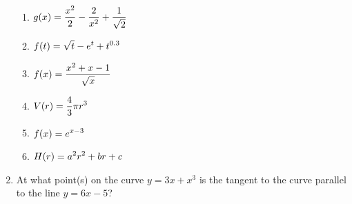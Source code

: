 \documentclass[11pt,fleqn]{article}
\begin{document}
\begin{enumerate}
\begin{enumerate}
\item  $\displaystyle g(x)=\frac{x^2}{2}-\frac{2}{x^2}+\frac{1}{\sqrt{2}}$
\vfill

\newpage
\item  $\displaystyle f(t)=\sqrt{t}-e^t+t^{0.3}$
\vfill

\item  $\displaystyle f(x)=\frac{x^2 + x -1}{\sqrt{x}}$
\vfill

\item $\displaystyle V(r)=\frac{4}{3}\pi r^3$
\vfill

\item  $\displaystyle f(x)= e^{x-3}$
\vfill

\item $\displaystyle H(r) = a^2r^2+br+c$
\vfill
\end{enumerate}
\item At what point(s) on the curve $y=3x+x^3$ is the tangent to the curve parallel to the line $y=6x-5$?
\vfill

\vfill
\end{enumerate}


 
\end{document}
